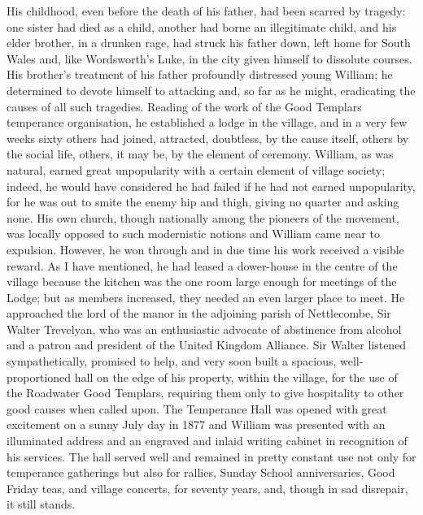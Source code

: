His childhood, even before the death of his father, had been scarred by tragedy: one sister had died as a child, another had borne an illegitimate child, and his elder brother, in a drunken rage, had struck his father down, left home for South Wales and, like Wordsworth's Luke, in the city given himself to dissolute courses. His brother's treatment of his father profoundly distressed young William; he determined to devote himself to attacking and, so far as he might, eradicating the causes of all such tragedies. Reading of the work of the Good Templars temperance organisation, he established a lodge in the village, and in a very few weeks sixty others had joined, attracted, doubtless, by the cause itself, others by the social life, others, it may be, by the element of ceremony. William, as was natural, earned great unpopularity with a certain element of village society; indeed, he would have considered he had failed if he had not earned unpopularity, for he was out to smite the enemy hip and thigh, giving no quarter and asking none. His own church, though nationally among the pioneers of the movement, was locally opposed to such modernistic notions and William came near to expulsion. However, he won through and in due time his work received a visible reward. As I have mentioned, he had leased a dower-house in the centre of the village because the kitchen was the one room large enough for meetings of the Lodge; but as members increased, they needed an even larger place to meet. He approached the lord of the manor in the adjoining parish of Nettlecombe, Sir Walter Trevelyan, who was an enthusiastic advocate of abstinence from alcohol and a patron and president of the United Kingdom Alliance. Sir Walter listened sympathetically, promised to help, and very soon built a spacious, well-proportioned hall on the edge of his property, within the village, for the use of the Roadwater Good Templars, requiring them only to give hospitality to other good causes when called upon. The Temperance Hall was opened with great excitement on a sunny July day in 1877 and William was presented with an illuminated address and an engraved and inlaid writing cabinet in recognition of his services. The hall served well and remained in pretty constant use not only for temperance gatherings but also for rallies, Sunday School anniversaries, Good Friday teas, and village concerts, for seventy years, and, though in sad disrepair, it still stands.

